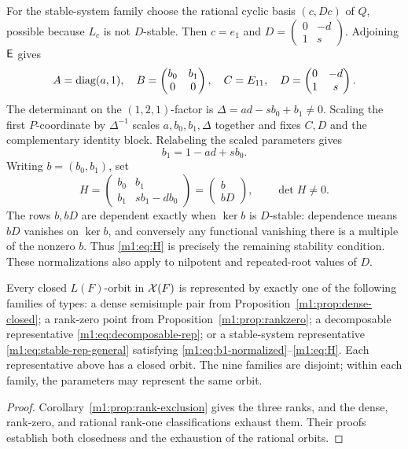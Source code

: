 For the stable-system family choose the rational cyclic basis $(c,Dc)$
of $Q$, possible because $L_c$ is not $D$-stable. Then $c=e_1$ and
$D=\left(\begin{smallmatrix}0&-d\\1&s\end{smallmatrix}\right)$.
Adjoining $\mathsf E$ gives
\begin{equation}\label{m1:eq:stable-rep-general}
 A=\operatorname{diag}(a,1),\quad
 B=\begin{pmatrix}b_0&b_1\\0&0\end{pmatrix},\quad C=E_{11},\quad
 D=\begin{pmatrix}0&-d\\1&s\end{pmatrix}.
\end{equation}
The determinant on the $(1,2,1)$-factor is
$\Delta=ad-sb_0+b_1\neq0$. Scaling the first $P$-coordinate by
$\Delta^{-1}$ scales $a,b_0,b_1,\Delta$ together and fixes $C,D$ and
the complementary identity block. Relabeling the scaled parameters gives
\begin{equation}\label{m1:eq:b1-normalized}
 b_1=1-ad+sb_0.
\end{equation}
Writing $b=(b_0,b_1)$, set
\begin{equation}\label{m1:eq:H}
 H=\begin{pmatrix}b_0&b_1\\b_1&sb_1-db_0\end{pmatrix}
   =\begin{pmatrix}b\\bD\end{pmatrix},\qquad\det H\neq0.
\end{equation}
The rows $b,bD$ are dependent exactly when $\ker b$ is $D$-stable:
dependence means $bD$ vanishes on $\ker b$, and conversely any functional
vanishing there is a multiple of the nonzero $b$. Thus \eqref{m1:eq:H} is
precisely the remaining stability condition. These normalizations also apply to nilpotent and repeated-root values of $D$.

\begin{theorem}\label{m1:thm:closed-orbits}
Every closed $L(F)$-orbit in $\mathcal X(F)$ is represented by exactly one of
the following families of types: a dense semisimple pair from
Proposition~\ref{m1:prop:dense-closed}; a rank-zero point from
Proposition~\ref{m1:prop:rankzero}; a decomposable representative
\eqref{m1:eq:decomposable-rep}; or a stable-system representative
\eqref{m1:eq:stable-rep-general} satisfying
\eqref{m1:eq:b1-normalized}--\eqref{m1:eq:H}. Each representative above has a closed orbit. The nine families are disjoint; within each family,
the parameters may represent the same orbit.
\end{theorem}
\begin{proof}
Corollary~\ref{m1:prop:rank-exclusion} gives the three ranks, and the dense,
rank-zero, and rational rank-one classifications exhaust them. Their
proofs establish both closedness and the exhaustion of the rational orbits.
\end{proof}

